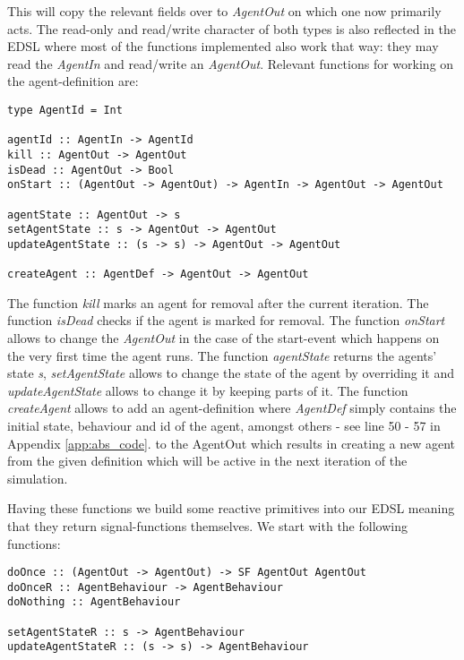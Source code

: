 This will copy the relevant fields over to \textit{AgentOut} on which one now primarily acts. The read-only and read/write character of both types is also reflected in the EDSL where most of the functions implemented also work that way: they may read the \textit{AgentIn} and read/write an \textit{AgentOut}. Relevant functions for working on the agent-definition are:

\begin{verbatim}
type AgentId = Int

agentId :: AgentIn -> AgentId
kill :: AgentOut -> AgentOut
isDead :: AgentOut -> Bool
onStart :: (AgentOut -> AgentOut) -> AgentIn -> AgentOut -> AgentOut

agentState :: AgentOut -> s
setAgentState :: s -> AgentOut -> AgentOut
updateAgentState :: (s -> s) -> AgentOut -> AgentOut

createAgent :: AgentDef -> AgentOut -> AgentOut
\end{verbatim}

The function \textit{kill} marks an agent for removal after the current iteration. The function \textit{isDead} checks if the agent is marked for removal. The function \textit{onStart} allows to change the \textit{AgentOut} in the case of the start-event which happens on the very first time the agent runs. The function \textit{agentState} returns the agents' state \textit{s}, \textit{setAgentState} allows to change the state of the agent by overriding it and \textit{updateAgentState} allows to change it by keeping parts of it. The function \textit{createAgent} allows to add an agent-definition where \textit{AgentDef} simply contains the initial state, behaviour and id of the agent, amongst others - see line 50 - 57 in Appendix \ref{app:abs_code}. to the AgentOut which results in creating a new agent from the given definition which will be active in the next iteration of the simulation. 

Having these functions we build some reactive primitives into our EDSL meaning that they return signal-functions themselves. We start with the following functions:

\begin{verbatim}
doOnce :: (AgentOut -> AgentOut) -> SF AgentOut AgentOut
doOnceR :: AgentBehaviour -> AgentBehaviour
doNothing :: AgentBehaviour

setAgentStateR :: s -> AgentBehaviour
updateAgentStateR :: (s -> s) -> AgentBehaviour
\end{verbatim}

